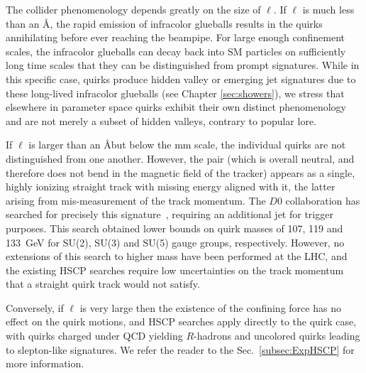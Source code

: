 The collider phenomenology depends greatly on the size of $\ell$.  If $\ell$ is much less than an \AA, the rapid emission of infracolor glueballs results in the quirks annihilating before ever reaching the beampipe.  For large enough confinement scales, the infracolor glueballs can decay back into SM particles on sufficiently long time scales that they can be distinguished from prompt signatures.  While in this specific case, quirks produce hidden valley \cite{Strassler:2006im} or emerging jet \cite{Schwaller:2015gea} signatures due to these long-lived infracolor glueballs (see Chapter \ref{sec:showers}), we stress that elsewhere in parameter space quirks exhibit their own distinct phenomenology and are not merely a subset of hidden valleys, contrary to popular lore.

If $\ell$ is larger than an \AA but below the mm scale, the individual quirks are not distinguished from one another. However, the pair (which is overall neutral, and therefore does not bend in the magnetic field of the tracker) appears as a single, highly ionizing straight track with missing energy aligned with it, the latter arising from mis-measurement of the track momentum. The $D0$ collaboration has searched for precisely this signature~\cite{Abazov:2010yb}, requiring an additional jet for trigger purposes. This search obtained lower bounds on quirk masses of 107, 119 and 133~GeV for SU(2), SU(3) and SU(5) gauge groups, respectively. However, no extensions of this search to higher mass have been performed at the LHC, and the existing HSCP searches require low uncertainties on the track momentum that a straight quirk track would not satisfy.

Conversely, if $\ell$ is very large then the existence of the confining force has no effect on the quirk motions, and HSCP searches apply directly to the quirk case, with quirks charged under QCD yielding $R$-hadrons and uncolored quirks leading to slepton-like signatures. We refer the reader to the Sec.~\ref{subsec:ExpHSCP} for more information.


